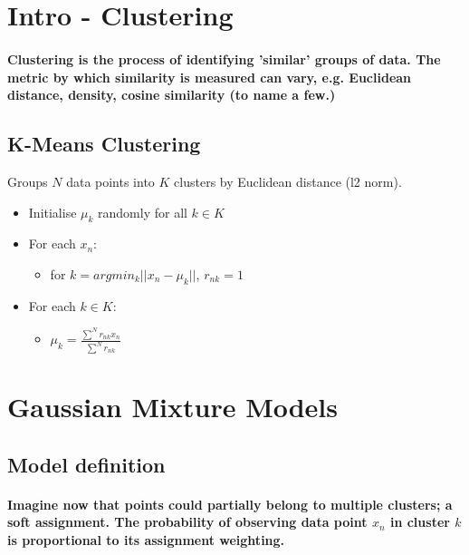 \documentclass[]{article}
\begin{document}
\section{Intro - Clustering}

\paragraph{Clustering is the process of identifying 'similar' groups of data. The metric by which similarity is measured can vary, e.g. Euclidean distance, density, cosine similarity (to name a few.)} 

\subsection{K-Means Clustering}

Groups $N$ data points into $K$ clusters by Euclidean distance (l2 norm).

\begin{itemize}

	\item Initialise $\mu_k$ randomly for all $k \in K$
	\item For each $x_n$:
	
		\begin{itemize}
			\item for $k = argmin_k ||x_n - \mu_k ||$, $r_{nk} = 1$  
		\end{itemize}
	
		\item For each $k \in K$:
		
		\begin{itemize}
			\item $\mu_k = \frac{\sum^N r_{nk} x_n}{\sum^N r_{nk}}$
		\end{itemize}
\end{itemize}


\section{Gaussian Mixture Models}
\subsection{Model definition}
\paragraph{Imagine now that points could partially belong to multiple clusters; a soft assignment. The probability of observing data point $x_n$ in cluster $k$ is proportional to its assignment weighting.}
\end{document}
